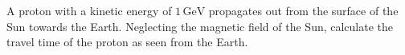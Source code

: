 A proton with a kinetic energy of $1\,\mathrm{GeV}$ propagates out from the
surface of the Sun towards the Earth. Neglecting the magnetic field of the
Sun, calculate the travel time of the proton as seen from the Earth.
